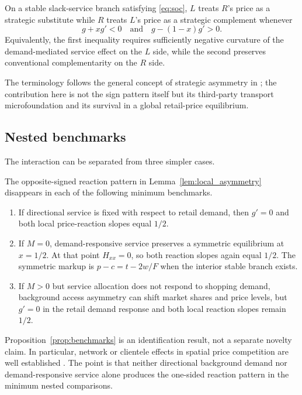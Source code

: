 \begin{lemma}\label{lem:local_asymmetry}
On a stable slack-service branch satisfying \eqref{eq:soc}, $L$ treats $R$'s price as a strategic substitute while $R$ treats $L$'s price as a strategic complement whenever
\begin{equation}
 g+xg'<0
 \quad\text{and}\quad
 g-(1-x)g'>0.
 \label{eq:local_asymmetry_condition}
\end{equation}
Equivalently, the first inequality requires sufficiently negative curvature of the demand-mediated service effect on the $L$ side, while the second preserves conventional complementarity on the $R$ side.
\end{lemma}

The terminology follows the general concept of strategic asymmetry in \citet{tombak2006}; the contribution here is not the sign pattern itself but its third-party transport microfoundation and its survival in a global retail-price equilibrium.

\subsection{Nested benchmarks}\label{subsec:benchmarks}

The interaction can be separated from three simpler cases.

\begin{proposition}\label{prop:benchmarks}
The opposite-signed reaction pattern in Lemma~\ref{lem:local_asymmetry} disappears in each of the following minimum benchmarks.
\begin{enumerate}
\item If directional service is fixed with respect to retail demand, then $g'=0$ and both local price-reaction slopes equal $1/2$.
\item If $M=0$, demand-responsive service preserves a symmetric equilibrium at $x=1/2$. At that point $H_{xx}=0$, so both reaction slopes again equal $1/2$. The symmetric markup is $p-c=t-2w/F$ when the interior stable branch exists.
\item If $M>0$ but service allocation does not respond to shopping demand, background access asymmetry can shift market shares and price levels, but $g'=0$ in the retail demand response and both local reaction slopes remain $1/2$.
\end{enumerate}
\end{proposition}

Proposition~\ref{prop:benchmarks} is an identification result, not a separate novelty claim. In particular, network or clientele effects in spatial price competition are well established \citep{grilo2001,grivavettas2011,tolottiyepez2020}. The point is that neither directional background demand nor demand-responsive service alone produces the one-sided reaction pattern in the minimum nested comparisons.
